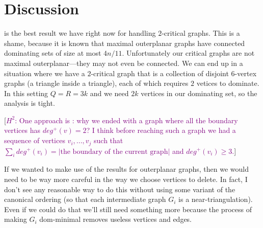 \documentclass[12pt]{article}
\theoremstyle{definition}
\newcommand{\hussein}[1]{[\textcolor{purple}{$H^2$: #1}]}
\begin{document}



\section{Discussion}

 is the best result we have right now for handling $2$-critical graphs.  This is a shame, because it is known that maximal outerplanar graphs have connected dominating sets of size at most $4n/11$. Unfortunately our critical graphs are not maximal outerplanar---they may not even be connected.  We can end up in a situation where we have a $2$-critical graph that is a collection of disjoint $6$-vertex graphs (a triangle inside a triangle), each of which requires $2$ vetices to dominate.  In this setting $Q=R=3k$ and we need $2k$ vertices in our dominating set, so the analysis is tight.

\hussein{One approach is : why we ended with a graph where all the boundary vertices has $deg^+(v) = 2$? I think before reaching such a graph we had a sequence of vertices $v_i,...,v_j$  such that $\sum_i deg^+(v_i) = |\text{the boundary of the current graph}|$ and $deg^+(v_i) \geq 3$.}

If we wanted to make use of the results for outerplanar graphs, then we would need to be way more careful in the way we choose vertices to delete.  In fact, I don't see any reasonable way to do this without using some variant of the canonical ordering (so that each intermediate graph $G_i$ is a near-triangulation).  Even if we could do that we'll still need something more because the process of making $G_i$ dom-minimal removes useless vertices and edges.

\end{document}
